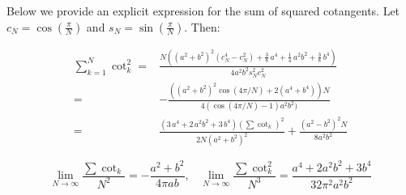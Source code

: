 Below we provide an explicit expression for the sum of squared cotangents. Let $c_N=\cos\left(\frac{\pi}{N}\right)$ and $s_N=\sin\left(\frac{\pi}{N}\right)$. Then:


\begin{align*}
\sum_{k=1}^N \cot_k^2 = &\frac {N \left(  \left( {a}^{2}+{b}^{2} \right) ^{2} (c_N^{
4}-  c_N^{2}) +\frac{3}{8}\,{a}^{4}+\frac{1}{4}
\,{a}^{2}{b}^{2}+\frac{3}{8}\,{b}^{4} \right) }{4{a}^{2}{b}^{2} s_N^{2}
 c_N^{2}}\\
 =& -\frac{((a^2+b^2)^2\cos(4\pi/N)+2 (a^4+ b^4)) N}{    4 (\cos(4\pi/N)-1)  a^2 b^2)}\\
 =&  \frac{\left( 3\,a^{4}+2\,a^{2}b^{2}+3\,b^{4}\right) (\sum\cot_k)^2}{2N\left( a^{2}+b^{2} \right)^{2}}+ \frac{
 \left(a^2-b^2 \right)^{2}   N}{8a^{2}b^{2}}
\end{align*} 

\[ \lim_{N\to\infty}\frac{\sum\cot_k}{N^2}=-\frac{ a^2+b^2}{4\pi ab},\;\;\;\lim_{N\to\infty}\frac{\sum\cot^2_k}{N^3}= \frac{ a^4+2 a^2 b^2 +3 b^4}{ 32\pi^2 a^2b^2   } \]
%
